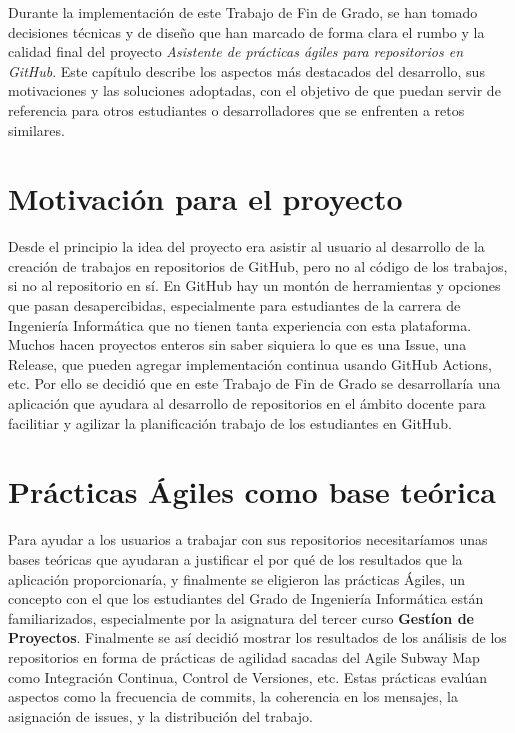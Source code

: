 
Durante la implementación de este Trabajo de Fin de Grado, se han tomado decisiones técnicas y de diseño que han marcado de forma clara el rumbo y la calidad final del proyecto \textit{Asistente de prácticas ágiles para repositorios en GitHub}. Este capítulo describe los aspectos más destacados del desarrollo, sus motivaciones y las soluciones adoptadas, con el objetivo de que puedan servir de referencia para otros estudiantes o desarrolladores que se enfrenten a retos similares.

\section{Motivación para el proyecto}
Desde el principio la idea del proyecto era asistir al usuario al desarrollo de la creación de trabajos en repositorios de GitHub, pero no al código de los trabajos, si no al repositorio en sí. En GitHub hay un montón de herramientas y opciones que pasan desapercibidas, especialmente para estudiantes de la carrera de Ingeniería Informática que no tienen tanta experiencia con esta plataforma. Muchos hacen proyectos enteros sin saber siquiera lo que es una Issue, una Release, que pueden agregar implementación continua usando GitHub Actions, etc. Por ello se decidió que en este Trabajo de Fin de Grado se desarrollaría una aplicación que ayudara al desarrollo de repositorios en el ámbito docente para facilitiar y agilizar la planificación trabajo de los estudiantes en GitHub.

\section{Prácticas Ágiles como base teórica}

Para ayudar a los usuarios a trabajar con sus repositorios necesitaríamos unas bases teóricas que ayudaran a justificar el por qué de los resultados que la aplicación proporcionaría, y finalmente se eligieron las prácticas Ágiles, un concepto con el que los estudiantes del Grado de Ingeniería Informática están familiarizados, especialmente por la asignatura del tercer curso \textbf{Gestíon de Proyectos}. Finalmente se así decidió mostrar los resultados de los análisis de los repositorios en forma de prácticas de agilidad sacadas del Agile Subway Map \cite{agileSubwayMap} como Integración Continua, Control de Versiones, etc. Estas prácticas evalúan aspectos como la frecuencia de commits, la coherencia en los mensajes, la asignación de issues, y la distribución del trabajo.

